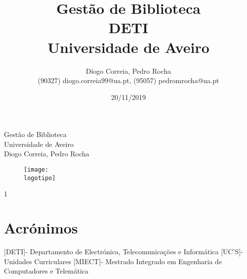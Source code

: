 \documentclass{report}
\begin{document}
%
\def\titulo{Gestão de Biblioteca}
\def\data{20/11/2019}
\def\autores{Diogo Correia, Pedro Rocha}
\def\autorescontactos{(90327) diogo.correia99@ua.pt, (95057) pedromrocha@ua.pt}
\def\versao{1}
\def\departamento{DETI}
\def\empresa{Universidade de Aveiro}
\def\logotipo{ua.pdf}
%
%
\begin{titlepage}

\begin{center}
%
\vspace*{50mm}
%
{\Huge \titulo}\\ 
%
\vspace{10mm}
%
{\Large \empresa}\\
%
\vspace{10mm}
%
{\LARGE \autores}\\ 
%
\vspace{30mm}
%
\begin{figure}[h]
\center
\texttt{[image: \\logotipo]}
\end{figure}
%
\vspace{30mm}
\end{center}
%
\begin{flushright}
\versao
\end{flushright}
\end{titlepage}

\title{%
{\Huge\textbf{\titulo}}\\
{\Large \departamento\\ \empresa}
}
%
\author{%
    \autores \\
    \autorescontactos
}
%
\date{\data}
%
\maketitle




\tableofcontents

\chapter*{Acrónimos}
\begin{acronym}
[DETI]{- Departamento de Electrónica, Telecomunicações e Informática}
 [UC'S]{- Unidades Curriculares}
[MIECT]{- Mestrado Integrado em Engenharia de Computadores e Telemática}
\end{acronym}
\clearpage
{}
\end{document}

